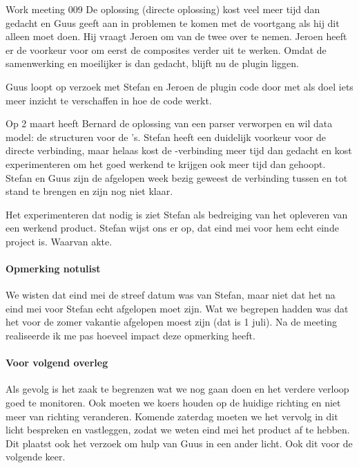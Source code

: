 \documentclass[a4paper,final]{article}
\begin{document}
\begin{Minutes}{Work meeting 009}
De \qml oplossing (directe oplossing) kost veel meer tijd dan gedacht en Guus
geeft aan in problemen te komen met de voortgang als hij dit alleen moet doen.
Hij vraagt Jeroen om \een van de twee over te nemen. Jeroen heeft er de voorkeur
voor om eerst de composites verder uit te werken. Omdat de samenwerking \qml en
\cpp moeilijker is dan gedacht, blijft nu de plugin liggen.

Guus loopt op verzoek met Stefan en Jeroen de plugin code door met als doel 
iets meer inzicht te verschaffen in hoe de code werkt.

Op 2 maart heeft Bernard de oplossing van een parser verworpen en wil \een data
model: de  structuren voor de \vt's. Stefan heeft een duidelijk
voorkeur voor de directe \qml verbinding, maar helaas kost de \qml-\cpp verbinding 
meer tijd dan gedacht en kost experimenteren om het goed werkend te krijgen ook 
meer tijd dan gehoopt. Stefan en Guus zijn de afgelopen week bezig geweest de 
verbinding tussen \qml en \cpp tot stand te brengen en zijn nog niet klaar.

Het experimenteren dat nodig is ziet Stefan als bedreiging van het opleveren van 
een werkend product. Stefan wijst ons er op, dat eind mei voor hem echt einde 
project is. Waarvan akte. 

\paragraph{Opmerking notulist} We wisten dat eind mei de streef datum was van Stefan, 
maar niet dat het na eind mei voor Stefan echt afgelopen moet zijn. Wat we begrepen 
hadden was dat het voor de zomer vakantie afgelopen moest zijn (dat is 1 juli). Na
de meeting realiseerde ik me pas hoeveel impact deze opmerking heeft.

\paragraph{Voor volgend overleg}
Als gevolg is het zaak te begrenzen wat we nog gaan doen en het verdere verloop goed 
te monitoren. Ook moeten we koers houden op de huidige richting en niet meer van richting 
veranderen. Komende zaterdag moeten we het vervolg in dit licht bespreken en vastleggen, 
zodat we weten eind mei het product af te hebben. Dit plaatst ook het verzoek om hulp
van Guus in een ander licht. Ook dit voor de volgende keer.


\end{Minutes}
\end{document}
